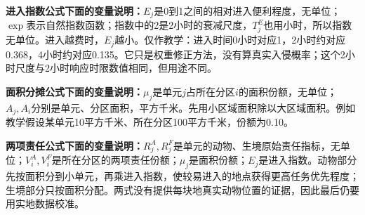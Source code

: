 \documentclass[12pt,a4paper]{article}
\numberwithin{equation}{section}
\begin{document}
\noindent\textbf{进入指数公式下面的变量说明：}$E_j$是0到1之间的相对进入便利程度，无单位；$\exp$表示自然指数函数；指数中的2是2小时的衰减尺度，$T_j^E$也用小时，所以指数无单位。进入越费时，$E_j$越小。仅作教学：进入时间0小时对应1，2小时约对应0.368，4小时约对应0.135。它只是权重修正方法，没有算真实入侵概率；这个2小时尺度与2小时响应时限数值相同，但用途不同。

\noindent\textbf{面积分摊公式下面的变量说明：}$\mu_j$是单元$j$占所在分区$i$的面积份额，无单位；$A_j,A_i$分别是单元、分区面积，平方千米。先用小区域面积除以大区域面积。例如教学假设某单元10平方千米、所在分区100平方千米，份额为0.10。

\noindent\textbf{两项责任公式下面的变量说明：}$R_j^A,R_j^F$是单元的动物、生境原始责任指标，无单位；$V_i^A,V_i^F$是所在分区的两项责任份额；$\mu_j$是面积份额；$E_j$是进入指数。动物部分先按面积分到小单元，再乘进入指数，使较易进入的地点获得更高任务优先程度；生境部分只按面积分配。两式没有提供每块地真实动物位置的证据，因此最后仍要用实地数据校准。
\end{document}
